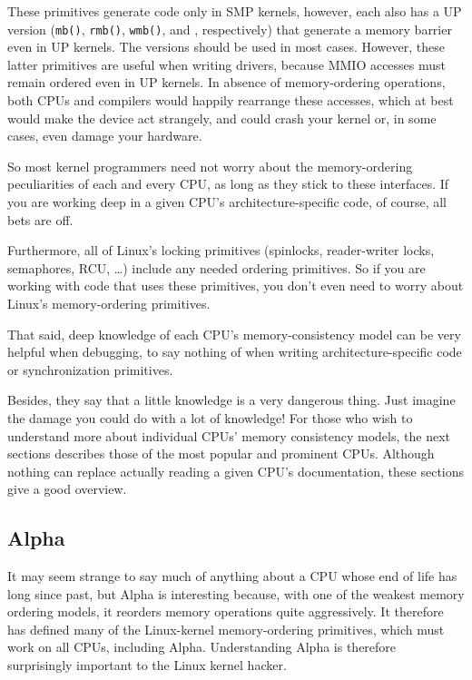 These primitives generate code only in SMP kernels, however, each
also has a UP version ({\tt mb()}, {\tt rmb()}, {\tt wmb()},
and ,
respectively) that generate a memory barrier even in UP kernels. The 
versions should be used in most cases. However, these latter primitives
are useful when writing drivers, because MMIO accesses must remain
ordered even in UP kernels. In absence of memory-ordering operations,
both CPUs and compilers would happily rearrange these accesses, which at
best would make the device act strangely, and could crash your kernel or,
in some cases, even damage your hardware.

So most kernel programmers need not worry about the memory-ordering
peculiarities of each and every CPU, as long as they stick to these
interfaces.
If you are working deep in a given CPU's architecture-specific code,
of course, all bets are off.

Furthermore,
all of Linux's locking primitives (spinlocks, reader-writer locks,
semaphores, RCU, \ldots) include any needed ordering primitives.
So if you are working with code that uses these primitives, you don't
even need to worry about Linux's memory-ordering primitives.

That said, deep knowledge of each CPU's memory-consistency model
can be very helpful when debugging, to say nothing of when writing
architecture-specific code or synchronization primitives.

Besides, they say that a little knowledge is a very dangerous thing.
Just imagine the damage you could do with a lot of knowledge!
For those who wish to understand more about individual CPUs'
memory consistency models, the next sections describes those of the
most popular and prominent CPUs.
Although nothing can replace actually reading a given CPU's documentation,
these sections give a good overview.

\subsection{Alpha}
\label{sec:memorder:Alpha}

It may seem strange to say much of anything about a CPU whose end of life
has long since past, but Alpha is interesting because, with one of
the weakest memory ordering models, it reorders memory operations quite
aggressively.
It therefore has defined many of the Linux-kernel memory-ordering primitives,
which must work on all CPUs, including Alpha.
Understanding Alpha is therefore surprisingly important to the Linux kernel
hacker.

